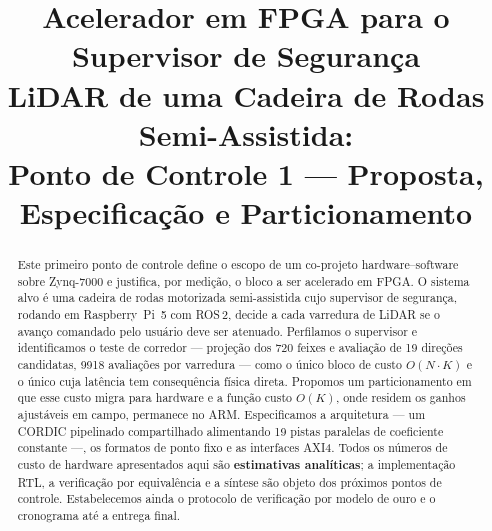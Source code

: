 \documentclass[conference]{IEEEtran}
\begin{document}
\title{Acelerador em FPGA para o Supervisor de Seguran\c{c}a\\
LiDAR de uma Cadeira de Rodas Semi-Assistida:\\
\large Ponto de Controle 1 --- Proposta, Especifica\c{c}\~ao e Particionamento}

\author{
\and
{}
}

\maketitle

\begin{abstract}
Este primeiro ponto de controle define o escopo de um co-projeto
hardware--software sobre Zynq-7000 e justifica, por medi\c{c}\~ao, o bloco a ser
acelerado em FPGA. O sistema alvo \'e uma cadeira de rodas motorizada
semi-assistida cujo supervisor de seguran\c{c}a, rodando em Raspberry~Pi~5 com
ROS\,2, decide a cada varredura de LiDAR se o avan\c{c}o comandado pelo usu\'ario
deve ser atenuado. Perfilamos o supervisor e identificamos o teste de corredor
--- proje\c{c}\~ao dos \num{720} feixes e avalia\c{c}\~ao de \num{19} dire\c{c}\~oes
candidatas, \num{9918} avalia\c{c}\~oes por varredura --- como o \'unico bloco de
custo $O(N\cdot K)$ e o \'unico cuja lat\^encia tem consequ\^encia f\'isica
direta. Propomos um particionamento em que esse custo migra para hardware e a
fun\c{c}\~ao custo $O(K)$, onde residem os ganhos ajust\'aveis em campo,
permanece no ARM. Especificamos a arquitetura --- um CORDIC pipelinado
compartilhado alimentando \num{19} pistas paralelas de coeficiente constante ---,
os formatos de ponto fixo e as interfaces AXI4. Todos os n\'umeros de custo de
hardware apresentados aqui s\~ao \textbf{estimativas anal\'iticas}; a
implementa\c{c}\~ao RTL, a verifica\c{c}\~ao por equival\^encia e a s\'intese
s\~ao objeto dos pr\'oximos pontos de controle. Estabelecemos ainda o protocolo
de verifica\c{c}\~ao por modelo de ouro e o cronograma at\'e a entrega final.
\end{abstract}

\end{document}
